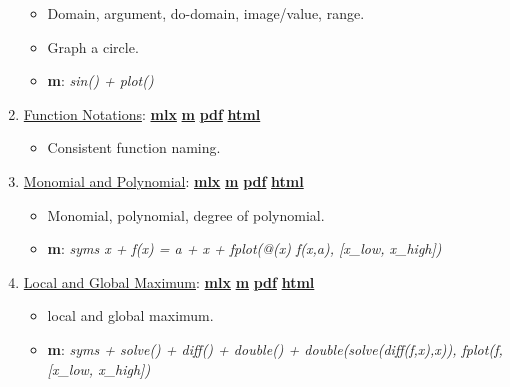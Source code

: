 \documentclass[
]{book}
\providecommand{\tightlist}{%
  \setlength{\itemsep}{0pt}\setlength{\parskip}{0pt}}
\begin{document}
\begin{enumerate}
  \begin{itemize}
  \tightlist
  \item
    Domain, argument, do-domain, image/value, range.
  \item
    Graph a circle.
  \item
    \textbf{m}: \emph{sin() + plot()}
  \end{itemize}
\item
  \href{https://fanwangecon.github.io/Math4Econ/calconevar/htmlpdfm/funcnotations.html}{Function Notations}: \href{https://github.com/FanWangEcon/Math4Econ/blob/master/calconevar/funcnotations.mlx}{\textbf{mlx}} \textbar{} \href{https://github.com/FanWangEcon/Math4Econ/blob/master/calconevar/htmlpdfm/funcnotations.m}{\textbf{m}} \textbar{} \href{https://github.com/FanWangEcon/Math4Econ/blob/master/calconevar/htmlpdfm/funcnotations.pdf}{\textbf{pdf}} \textbar{} \href{https://fanwangecon.github.io/Math4Econ/calconevar/htmlpdfm/funcnotations.html}{\textbf{html}}

  \begin{itemize}
  \tightlist
  \item
    Consistent function naming.
  \end{itemize}
\item
  \href{https://fanwangecon.github.io/Math4Econ/calconevar/htmlpdfm/polynomial.html}{Monomial and Polynomial}: \href{https://github.com/FanWangEcon/Math4Econ/blob/master/calconevar/polynomial.mlx}{\textbf{mlx}} \textbar{} \href{https://github.com/FanWangEcon/Math4Econ/blob/master/calconevar/htmlpdfm/polynomial.m}{\textbf{m}} \textbar{} \href{https://github.com/FanWangEcon/Math4Econ/blob/master/calconevar/htmlpdfm/polynomial.pdf}{\textbf{pdf}} \textbar{} \href{https://fanwangecon.github.io/Math4Econ/calconevar/htmlpdfm/polynomial.html}{\textbf{html}}

  \begin{itemize}
  \tightlist
  \item
    Monomial, polynomial, degree of polynomial.
  \item
    \textbf{m}: \emph{syms x + f(x) = a + x + fplot(@(x) f(x,a), {[}x\_low, x\_high{]})}
  \end{itemize}
\item
  \href{https://fanwangecon.github.io/Math4Econ/calconevar/htmlpdfm/localglobal.html}{Local and Global Maximum}: \href{https://github.com/FanWangEcon/Math4Econ/blob/master/calconevar/localglobal.mlx}{\textbf{mlx}} \textbar{} \href{https://github.com/FanWangEcon/Math4Econ/blob/master/calconevar/htmlpdfm/localglobal.m}{\textbf{m}} \textbar{} \href{https://github.com/FanWangEcon/Math4Econ/blob/master/calconevar/htmlpdfm/localglobal.pdf}{\textbf{pdf}} \textbar{} \href{https://fanwangecon.github.io/Math4Econ/calconevar/htmlpdfm/localglobal.html}{\textbf{html}}

  \begin{itemize}
  \tightlist
  \item
    local and global maximum.
  \item
    \textbf{m}: \emph{syms + solve() + diff() + double() + double(solve(diff(f,x),x)), fplot(f,{[}x\_low, x\_high{]})}
  \end{itemize}
\end{enumerate}
\end{document}
